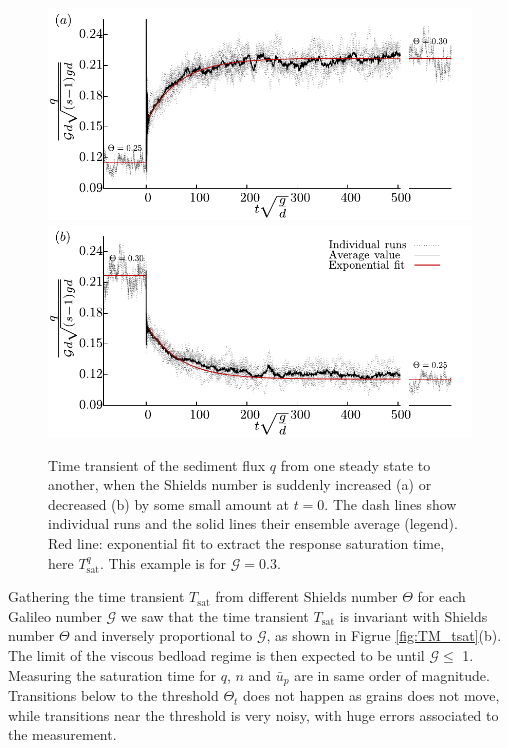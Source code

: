 \begin{figure}
    \centering
    \includegraphics[width=0.8\linewidth]{04-figuras/TMa-transitionqup.pdf}
    \includegraphics[width=0.8\linewidth]{04-figuras/TMb-transitionqdown.pdf}
    \caption[Temporal transport transition.]{Time transient of the sediment flux $q$ from one steady state to another, when the Shields number is suddenly increased (a) or decreased (b) by some small amount at $t=0$. The dash lines show individual runs and the solid lines their ensemble average (legend). Red line: exponential fit to extract the response saturation time, here $T^q_\textrm{sat}$. This example is for $\mathcal{G}=0.3$.}
    \label{fig:TM_transition}
\end{figure}

    Gathering the time transient $T_\textrm{sat}$ from different Shields number $\Theta$ for each Galileo number $\mathcal{G}$ we saw that the time transient $T_\textrm{sat}$ is invariant with Shields number $\Theta$ and inversely proportional to $\mathcal{G}$, as shown in Figrue \ref{fig:TM_tsat}(b). The limit of the viscous bedload regime is then expected to be until $\mathcal{G} \leq$ 1. Measuring the saturation time for $q$, $n$ and $\bar{u}_{p}$ are in same order of magnitude. Transitions below to the threshold $\Theta_t$ does not happen as grains does not move, while transitions near the threshold is very noisy, with huge errors associated to the measurement.

